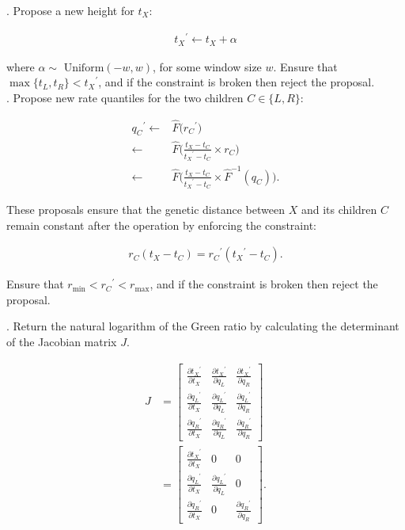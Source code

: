 \documentclass[12pt]{article}
\begin{document}
. Propose a new height for $t_X$:

\begin{align}
	{t_X}^\prime \leftarrow t_X + \alpha
\end{align}

where $\alpha \sim \text{ Uniform}(-w, w)$, for some window size $w$. Ensure that $\max\{t_L, t_R \} < {t_X}^\prime$, and if the constraint is broken then reject the proposal.  \\


. Propose new rate quantiles for the two children $C \in \{L, R\}$:



\begin{align}
	{q_C}^\prime  \leftarrow & \hat{F}\Big({r_C}^\prime \Big)  \nonumber \\
				\leftarrow & \hat{F} \Big( \frac{t_X - t_C}{{t_X}^\prime - t_C} \times r_C \Big) \nonumber \\
				\leftarrow & \hat{F} \Big( \frac{t_X - t_C}{{t_X}^\prime - t_C} \times \hat{F}^{-1}(q_C) \Big).
\end{align}




These proposals ensure that the genetic distance between $X$ and its children $C$ remain constant after the operation by enforcing the constraint:


\begin{align}
	r_C (t_X - t_C) = {r_C}^\prime ({t_X}^\prime - t_C).
\end{align}


Ensure that $r_\text{min} < {r_C}^\prime < r_\text{max}$, and if the constraint is broken then reject the proposal. 



. Return the natural logarithm of the Green ratio by calculating the determinant of the Jacobian matrix $J$.



\begin{align}
	J &= \begin{bmatrix} \frac{\partial {t_X}^\prime}{\partial t_X} & \frac{\partial {t_X}^\prime}{\partial q_L} & \frac{\partial {t_X}^\prime}{\partial q_R} \\
						\frac{\partial {q_L}^\prime}{\partial t_X} & \frac{\partial {q_L}^\prime}{\partial q_L} & \frac{\partial {q_L}^\prime}{\partial q_R} \\
						\frac{\partial {q_R}^\prime}{\partial t_X} & \frac{\partial {q_R}^\prime}{\partial q_L} & \frac{\partial {q_R}^\prime}{\partial q_R} \end{bmatrix} \nonumber \\
		&= \begin{bmatrix} \frac{\partial {t_X}^\prime}{\partial t_X} & 0 & 0 \\
						\frac{\partial {q_L}^\prime}{\partial t_X} & \frac{\partial {q_L}^\prime}{\partial q_L} & 0\\
						\frac{\partial {q_R}^\prime}{\partial t_X} & 0 & \frac{\partial {q_R}^\prime}{\partial q_R} \end{bmatrix}.
\end{align}
\end{document}
